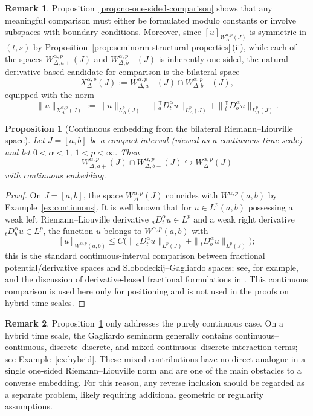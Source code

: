 \documentclass[11pt,a4paper]{article}
\numberwithin{equation}{section}
\newtheorem{proposition}[proposition]{Proposition}
\theoremstyle{definition}
\newtheorem{remark}[remark]{Remark}
\newcommand{\T}{\mathbb{T}}
\begin{document}
\begin{remark}\label{rem:bilateral-candidate}
Proposition~\ref{prop:no-one-sided-comparison} shows that any meaningful comparison must either be formulated modulo constants or involve subspaces with boundary conditions. Moreover, since $[u]_{W^{\alpha,p}_\Delta(J)}$ is symmetric in $(t,s)$ by Proposition~\ref{prop:seminorm-structural-properties}\,(ii), while each of the spaces $W^{\alpha,p}_{\Delta,a+}(J)$ and $W^{\alpha,p}_{\Delta,b-}(J)$ is inherently one-sided, the natural derivative-based candidate for comparison is the bilateral space
\[
X^{\alpha,p}_\Delta(J)
:=
W^{\alpha,p}_{\Delta,a+}(J)\cap W^{\alpha,p}_{\Delta,b-}(J),
\]
equipped with the norm
\[
\|u\|_{X^{\alpha,p}_\Delta(J)}
:=
\|u\|_{L^p_\Delta(J)}
+
\|{}^{\T}_{a}D_t^\alpha u\|_{L^p_\Delta(J)}
+
\|{}^{\T}_{t}D_b^\alpha u\|_{L^p_\Delta(J)}.
\]
\end{remark}

\begin{proposition}[Continuous embedding from the bilateral
Riemann--Liouville space]\label{prop:inclusion}
Let $J=[a,b]$ be a compact interval (viewed as a
continuous time scale) and let $0<\alpha<1$, $1<p<\infty$.
Then
\[
W^{\alpha,p}_{\Delta,a+}(J)\cap W^{\alpha,p}_{\Delta,b-}(J)
\hookrightarrow W^{\alpha,p}_\Delta(J)
\]
with continuous embedding.
\end{proposition}

\begin{proof}
On $J=[a,b]$, the space $W^{\alpha,p}_\Delta(J)$
coincides with $W^{\alpha,p}(a,b)$ by Example~\ref{ex:continuous}.
It is well known that for $u\in L^p(a,b)$ possessing a
weak left Riemann--Liouville derivative
${}_aD^\alpha_t u\in L^p$ and a weak right derivative
${}_tD^\alpha_b u\in L^p$, the function $u$ belongs to
$W^{\alpha,p}(a,b)$ with
\[
[u]_{W^{\alpha,p}(a,b)}
\le C\bigl(\|{}_aD^\alpha_t u\|_{L^p(J)}
+ \|{}_tD^\alpha_b u\|_{L^p(J)}\bigr);
\]
this is the standard continuous-interval comparison between fractional potential/derivative spaces and Slobodeckij--Gagliardo spaces; see, for example, \cite[Proposition~2.2]{DiNezzaPalatucciValdinoci2012} and the discussion of derivative-based fractional formulations in \cite[Section~2]{FrankSeiringer2008}. This continuous comparison is used here only for positioning and is not used in the proofs on hybrid time scales.
\end{proof}

\begin{remark}\label{rem:reverse-embedding-question}
Proposition~\ref{prop:inclusion} only addresses the purely continuous case. On a hybrid time scale, the Gagliardo seminorm generally contains continuous--continuous, discrete--discrete, and mixed continuous--discrete interaction terms; see Example~\ref{ex:hybrid}. These mixed contributions have no direct analogue in a single one-sided Riemann--Liouville norm and are one of the main obstacles to a converse embedding. For this reason, any reverse inclusion should be regarded as a separate problem, likely requiring additional geometric or regularity assumptions.
\end{remark}
\end{document}
